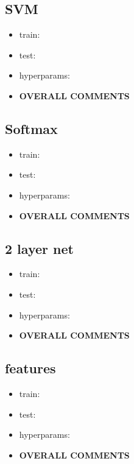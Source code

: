\documentclass[10pt,letterpaper]{article}
\begin{document}
\subsection{SVM}
\begin{solution}
\begin{itemize}
\item train:
\item test:
\item hyperparams:
\subitem
\subitem
\item \textbf{OVERALL COMMENTS}
\subitem
\subitem
\subitem
\end{itemize}
\end{solution}

\subsection{Softmax}
\begin{solution}
\begin{itemize}
\item train:
\item test:
\item hyperparams:
\subitem
\subitem
\item \textbf{OVERALL COMMENTS}
\subitem
\subitem
\subitem
\end{itemize}
\end{solution}

\subsection{2 layer net}
\begin{solution}
\begin{itemize}
\item train:
\item test:
\item hyperparams:
\subitem
\subitem
\item \textbf{OVERALL COMMENTS}
\subitem
\subitem
\subitem
\end{itemize}
\end{solution}

\subsection{features}
\begin{solution}
\begin{itemize}
\item train:
\item test:
\item hyperparams:
\subitem
\subitem
\item \textbf{OVERALL COMMENTS}
\subitem
\subitem
\subitem
\end{itemize}
\end{solution}
\end{document}
